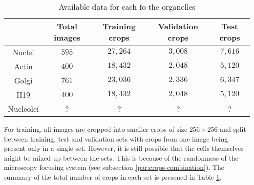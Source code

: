 \begin{table}[H]
    \centering
    \caption{Available data for each fo the organelles}
        \begin{adjustbox}{width=0.7\textwidth}
            \begin{tabular}{|c||c|c|c|c|}\hline
                &Total images
                &Training crops
                &Validation crops
                &Test crops
                \\\hline\hline
                Nuclei & $595$ & $27,264$ & $3,008$ & $7,616$\\\hline
                Actin &$400$ & $18,432$ & $2,048$ &$5,120$\\\hline
                Golgi & $761$ & $23,036$ & $2,336$ & $6,347$\\\hline
                H19 & $400$ & $18,432$ & $2,048$ & $5,120$ \\\hline
                Nucleolei &?&?&?&?\\\hline
            \end{tabular}
        \end{adjustbox}
    \label{table:data}
\end{table}

For training, all images are cropped into smaller crops of size $256 \times 256$ and split between training, test and validation sets with crops from one image being present only in a single set. However, it is still possible that the cells themselves might be mixed up between the sets. This is because of the randomness of the microscopy focusing system (see subsection \ref{par:crops-combination}). The summary of the total number of crops in each set is presened in Table \ref{table:data}.
